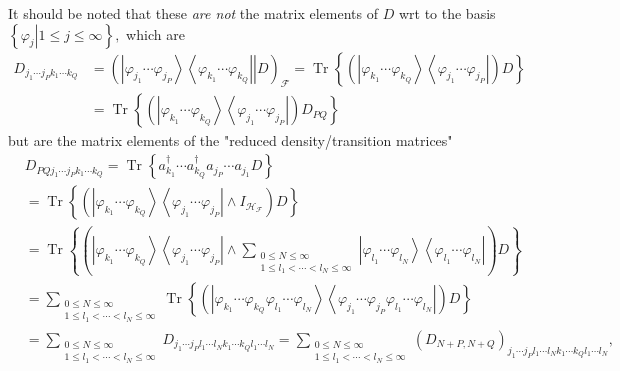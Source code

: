 \documentclass[aps,preprint]{revtex4}%
\begin{document}
It should be noted that these \emph{are not} the matrix elements of $D$ wrt to
the basis $\left\{  \left.  \varphi_{j}\right\vert 1\leq j\leq\infty\right\}
,$ which are
\begin{align}
D_{j_{1}\cdots j_{P}k_{1}\cdots k_{Q}}  &  =\left(  \left.  \left\vert
\varphi_{j_{1}}\cdots\varphi_{j_{P}}\right\rangle \left\langle \varphi_{k_{1}%
}\cdots\varphi_{k_{Q}}\right\vert \right\vert D\right)  _{\mathcal{F}%
}=\operatorname{Tr}\left\{  \left(  \left\vert \varphi_{k_{1}}\cdots
\varphi_{k_{Q}}\right\rangle \left\langle \varphi_{j_{1}}\cdots\varphi_{j_{P}%
}\right\vert \right)  D\right\} \nonumber\\
&  =\operatorname{Tr}\left\{  \left(  \left\vert \varphi_{k_{1}}\cdots
\varphi_{k_{Q}}\right\rangle \left\langle \varphi_{j_{1}}\cdots\varphi_{j_{P}%
}\right\vert \right)  D_{PQ}\right\}
\end{align}
but are the matrix elements of the "reduced density/transition matrices"
\begin{align}
&  D_{PQj_{1}\cdots j_{P}k_{1}\cdots k_{Q}}=\operatorname{Tr}\left\{
a_{k_{1}}^{\dagger}\cdots a_{k_{Q}}^{\dagger}a_{j_{P}}\cdots a_{j_{1}%
}D\right\} \nonumber\\
&  =\operatorname{Tr}\left\{  \left(  \left\vert \varphi_{k_{1}}\cdots
\varphi_{k_{Q}}\right\rangle \left\langle \varphi_{j_{1}}\cdots\varphi_{j_{P}%
}\right\vert \wedge I_{\mathcal{H}_{\mathcal{F}}}\right)  D\right\}
\nonumber\\
&  =\operatorname{Tr}\left\{  \left(  \left\vert \varphi_{k_{1}}\cdots
\varphi_{k_{Q}}\right\rangle \left\langle \varphi_{j_{1}}\cdots\varphi_{j_{P}%
}\right\vert \wedge\sum_{\substack{0\leq N\leq\infty\\1\leq l_{1}<\cdots
<l_{N}\leq\infty}}\left\vert \varphi_{l_{1}}\cdots\varphi_{l_{N}}\right\rangle
\left\langle \varphi_{l_{1}}\cdots\varphi_{l_{N}}\right\vert \right)
D\right\} \nonumber\\
&  =\sum_{\substack{0\leq N\leq\infty\\1\leq l_{1}<\cdots<l_{N}\leq\infty
}}\operatorname{Tr}\left\{  \left(  \left\vert \varphi_{k_{1}}\cdots
\varphi_{k_{Q}}\varphi_{l_{1}}\cdots\varphi_{l_{N}}\right\rangle \left\langle
\varphi_{j_{1}}\cdots\varphi_{j_{P}}\varphi_{l_{1}}\cdots\varphi_{l_{N}%
}\right\vert \right)  D\right\} \nonumber\\
&  =\sum_{\substack{0\leq N\leq\infty\\1\leq l_{1}<\cdots<l_{N}\leq\infty
}}D_{j_{1}\cdots j_{P}l_{1}\cdots l_{N}k_{1}\cdots k_{Q}l_{1}\cdots l_{N}%
}=\sum_{\substack{0\leq N\leq\infty\\1\leq l_{1}<\cdots<l_{N}\leq\infty
}}\left(  D_{N+P,N+Q}\right)  _{j_{1}\cdots j_{P}l_{1}\cdots l_{N}k_{1}\cdots
k_{Q}l_{1}\cdots l_{N}},
\end{align}
\end{document}
